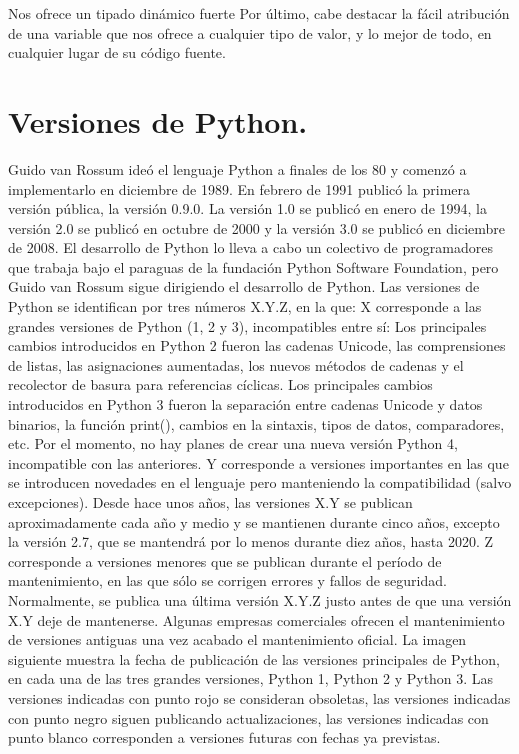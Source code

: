 Nos ofrece un tipado dinámico fuerte
Por último, cabe destacar la fácil atribución de una variable que nos ofrece a cualquier tipo de valor, y lo mejor de todo, en cualquier lugar de su código fuente.
\cite{BeJobWebSite}


\section{Versiones de Python.}

Guido van Rossum ideó el lenguaje Python a finales de los 80 y comenzó a implementarlo en diciembre de 1989. En febrero de 1991 publicó la primera versión pública, la versión 0.9.0. La versión 1.0 se publicó en enero de 1994, la versión 2.0 se publicó en octubre de 2000 y la versión 3.0 se publicó en diciembre de 2008. El desarrollo de Python lo lleva a cabo un colectivo de programadores que trabaja bajo el paraguas de la fundación Python Software Foundation, pero Guido van Rossum sigue dirigiendo el desarrollo de Python.
Las versiones de Python se identifican por tres números X.Y.Z, en la que:
X corresponde a las grandes versiones de Python (1, 2 y 3), incompatibles entre sí:
Los principales cambios introducidos en Python 2 fueron las cadenas Unicode, las comprensiones de listas, las asignaciones aumentadas, los nuevos métodos de cadenas y el recolector de basura para referencias cíclicas.
Los principales cambios introducidos en Python 3 fueron la separación entre cadenas Unicode y datos binarios, la función print(), cambios en la sintaxis, tipos de datos, comparadores, etc.
Por el momento, no hay planes de crear una nueva versión Python 4, incompatible con las anteriores.
Y corresponde a versiones importantes en las que se introducen novedades en el lenguaje pero manteniendo la compatibilidad (salvo excepciones).
Desde hace unos años, las versiones X.Y se publican aproximadamente cada año y medio y se mantienen durante cinco años, excepto la versión 2.7, que se mantendrá por lo menos durante diez años, hasta 2020.
Z corresponde a versiones menores que se publican durante el período de mantenimiento, en las que sólo se corrigen errores y fallos de seguridad.
Normalmente, se publica una última versión X.Y.Z justo antes de que una versión X.Y deje de mantenerse. Algunas empresas comerciales ofrecen el mantenimiento de versiones antiguas una vez acabado el mantenimiento oficial.
La imagen siguiente muestra la fecha de publicación de las versiones principales de Python, en cada una de las tres grandes versiones, Python 1, Python 2 y Python 3. Las versiones indicadas con punto rojo se consideran obsoletas, las versiones indicadas con punto negro siguen publicando actualizaciones, las versiones indicadas con punto blanco corresponden a versiones futuras con fechas ya previstas.

